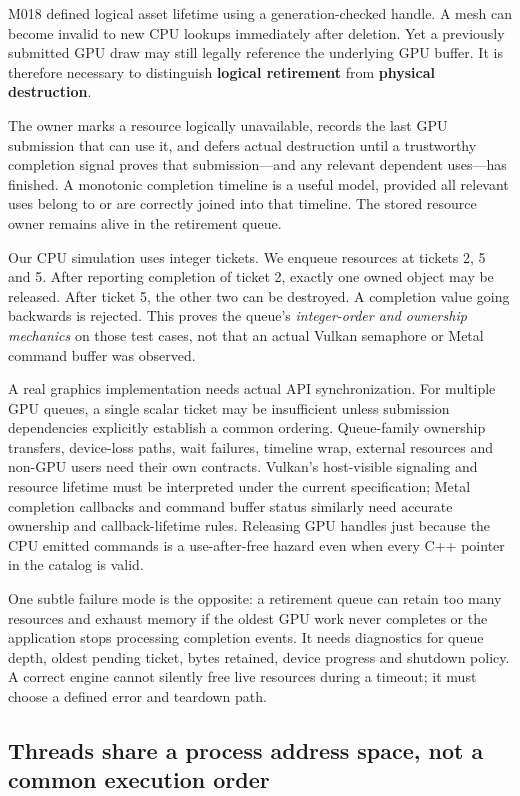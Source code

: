 M018 defined logical asset lifetime using a generation-checked handle. A mesh can become invalid to new CPU lookups immediately after deletion. Yet a previously submitted GPU draw may still legally reference the underlying GPU buffer. It is therefore necessary to distinguish \textbf{logical retirement} from \textbf{physical destruction}.

The owner marks a resource logically unavailable, records the last GPU submission that can use it, and defers actual destruction until a trustworthy completion signal proves that submission---and any relevant dependent uses---has finished. A monotonic completion timeline is a useful model, provided all relevant uses belong to or are correctly joined into that timeline. The stored resource owner remains alive in the retirement queue.

Our CPU simulation uses integer tickets. We enqueue resources at tickets 2, 5 and 5. After reporting completion of ticket 2, exactly one owned object may be released. After ticket 5, the other two can be destroyed. A completion value going backwards is rejected. This proves the queue's \emph{integer-order and ownership mechanics} on those test cases, not that an actual Vulkan semaphore or Metal command buffer was observed.

A real graphics implementation needs actual API synchronization. For multiple GPU queues, a single scalar ticket may be insufficient unless submission dependencies explicitly establish a common ordering. Queue-family ownership transfers, device-loss paths, wait failures, timeline wrap, external resources and non-GPU users need their own contracts. Vulkan's host-visible signaling and resource lifetime must be interpreted under the current specification; Metal completion callbacks and command buffer status similarly need accurate ownership and callback-lifetime rules. Releasing GPU handles just because the CPU emitted commands is a use-after-free hazard even when every C++ pointer in the catalog is valid.

One subtle failure mode is the opposite: a retirement queue can retain too many resources and exhaust memory if the oldest GPU work never completes or the application stops processing completion events. It needs diagnostics for queue depth, oldest pending ticket, bytes retained, device progress and shutdown policy. A correct engine cannot silently free live resources during a timeout; it must choose a defined error and teardown path.

\subsection{Threads share a process address space, not a common execution order}\label{05-engine-i-ch007-threads-share-a-process-address-space-not-a-common-execution-order}

